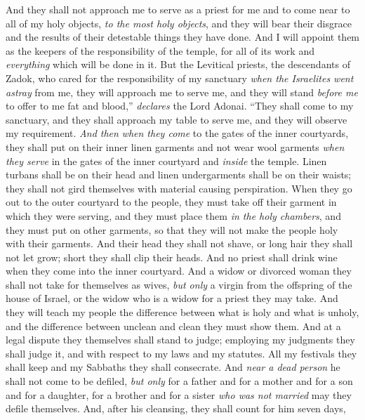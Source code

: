 \begin{biblechapter}
\verse And they shall not approach me to serve as a priest for me and to come near to all of my holy objects, \textit{to the most holy objects},  and they will bear their disgrace and the results of their detestable things they have done.
\verse And I will appoint them as the keepers of the responsibility of the temple, for all of its work and \textit{everything} which will be done in it.
\verse But the Levitical priests, the descendants of Zadok, who cared for the responsibility of my sanctuary \textit{when the Israelites went astray} from me, they will approach me to serve me, and they will stand \textit{before me} to offer to me fat and blood,” \textit{declares} the Lord Adonai.
\verse “They shall come to my sanctuary, and they shall approach my table to serve me, and they will observe my requirement.
\verse \textit{And then} \textit{when they come} to the gates of the inner courtyards, they shall put on their inner linen garments and not wear wool garments \textit{when they serve} in the gates of the inner courtyard and \textit{inside} the temple.
\verse Linen turbans shall be on their head and linen undergarments shall be on their waists; they shall not gird themselves with material causing perspiration.
\verse When they go out to the outer courtyard to the people, they must take off their garment in which they were serving, and they must place them \textit{in the holy chambers}, and they must put on other garments, so that they will not make the people holy with their garments.
\verse And their head they shall not shave, or long hair they shall not let grow; short they shall clip their heads.
\verse And no priest shall drink wine when they come into the inner courtyard.
\verse And a widow or divorced woman they shall not take for themselves as wives, \textit{but only} a virgin from the offspring of the house of Israel, or the widow who is a widow for a priest they may take.
\verse And they will teach my people the difference between what is holy and what is unholy, and the difference between unclean and clean they must show them.
\verse And at a legal dispute they themselves shall stand to judge; employing my judgments they shall judge it, and with respect to my laws and my statutes. All my festivals they shall keep and my Sabbaths they shall consecrate.
\verse And \textit{near a dead person} he shall not come to be defiled, \textit{but only} for a father and for a mother and for a son and for a daughter, for a brother and for a sister \textit{who was not married} may they defile themselves.
\verse And, after his cleansing, they shall count for him seven days,

\end{biblechapter}
